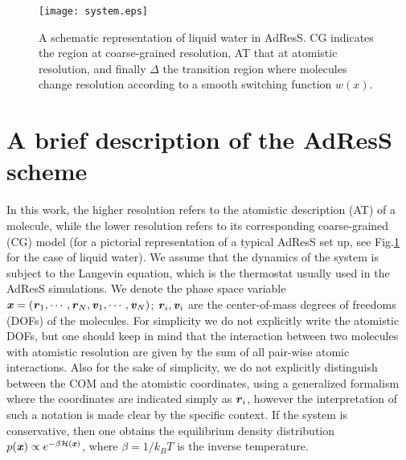 \documentclass[aip,jcp,a4paper,reprint,onecolumn]{revtex4-1}
\newcommand{\vect}[1]{\textbf{\textit{#1}}}
\newcommand{\dd}[1]{\textsf{#1}}
\begin{document}
\begin{figure}
  \centering
  \texttt{[image: system.eps]}
  \caption{A schematic representation of liquid water in AdResS. CG indicates the region at coarse-grained resolution, AT that at atomistic resolution, and finally $\Delta$ the transition region where molecules change resolution according to a smooth switching function $w(x)$.}
  \label{fig:adress-water}
\end{figure}

\section{A brief description of the AdResS scheme}

In this work, the higher resolution refers to the atomistic
description (AT) of a molecule, while the lower resolution refers to
its corresponding coarse-grained (CG) model (for a pictorial representation of a typical AdResS set up, see Fig.\ref{fig:adress-water} for the case of liquid water).
We assume that the dynamics of the
system is subject to the Langevin equation, which is the thermostat
usually used in the AdResS simulations.
We denote the
phase space variable $\vect x = (\vect r_1,\cdots,\vect r_N, \vect v_1,\cdots,\vect v_N)$; $\vect r_i,
\vect v_i$ are the center-of-mass
degrees of freedoms (DOFs) of the molecules.
For simplicity we do not explicitly write the
  atomistic DOFs, but one should keep in mind that the interaction
  between two  molecules with atomistic resolution
  are given by the sum of all pair-wise atomic interactions.
  Also for the sake of simplicity,
  we do not explicitly distinguish between the COM and the atomistic coordinates,
  using a generalized formalism where the coordinates are indicated simply as $\vect r_i$, however the interpretation of such a notation is
  made clear by the specific context.
If the
system is conservative, %
then one obtains the equilibrium density distribution $p(\vect
x)\propto e^{-\beta\mathcal H(\vect x)}$, where $\beta = 1/k_BT$ is the inverse temperature.
\end{document}
